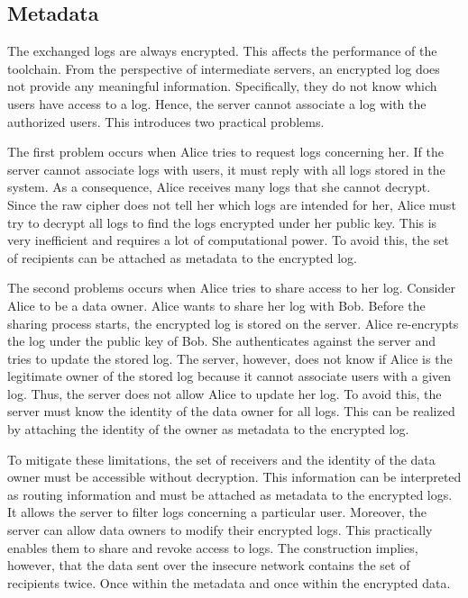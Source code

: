 \documentclass[../main.tex]{subfiles}
\begin{document}
\subsection{Metadata}
\label{sec:metadata}
The exchanged logs are always encrypted.
This affects the performance of the toolchain.
From the perspective of intermediate servers, an encrypted log does not provide any meaningful information.
Specifically, they do not know which users have access to a log.
Hence, the server cannot associate a log with the authorized users.
This introduces two practical problems.

The first problem occurs when Alice tries to request logs concerning her.
If the server cannot associate logs with users, it must reply with all logs stored in the system.
As a consequence, Alice receives many logs that she cannot decrypt.
Since the raw cipher does not tell her which logs are intended for her, Alice must try to decrypt all logs to find the logs encrypted under her public key.
This is very inefficient and requires a lot of computational power.
To avoid this, the set of recipients can be attached as metadata to the encrypted log.

The second problems occurs when Alice tries to share access to her log.
Consider Alice to be a data owner.
Alice wants to share her log with Bob.
Before the sharing process starts, the encrypted log is stored on the server.
Alice re-encrypts the log under the public key of Bob.
She authenticates against the server and tries to update the stored log.
The server, however, does not know if Alice is the legitimate owner of the stored log because it cannot associate users with a given log.
Thus, the server does not allow Alice to update her log.
To avoid this, the server must know the identity of the data owner for all logs.
This can be realized by attaching the identity of the owner as metadata to the encrypted log.

To mitigate these limitations, the set of receivers and the identity of the data owner must be accessible without decryption.
This information can be interpreted as routing information and must be attached as metadata to the encrypted logs.
It allows the server to filter logs concerning a particular user.
Moreover, the server can allow data owners to modify their encrypted logs.
This practically enables them to share and revoke access to logs.
The construction implies, however, that the data sent over the insecure network contains the set of recipients twice.
Once within the metadata and once within the encrypted data.
\end{document}
